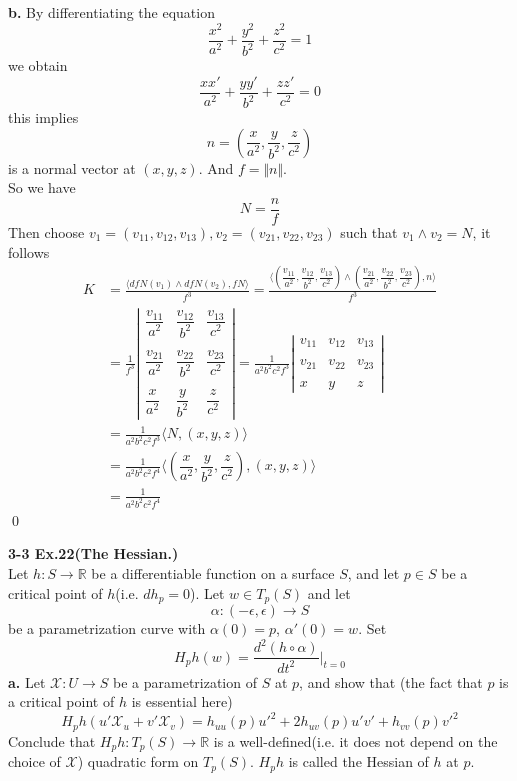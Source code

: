 \documentclass{article}
\begin{document}
\par
\textbf{b. }By differentiating the equation 
$$
    \frac{x^2}{a^2} + \frac{y^2}{b^2} + \frac{z^2}{c^2} = 1
$$
we obtain
$$
    \frac{xx'}{a^2} + \frac{yy'}{b^2} + \frac{zz'}{c^2} = 0
$$
this implies
$$
    n = (\frac{x}{a^2}, \frac{y}{b^2}, \frac{z}{c^2})
$$
is a normal vector at $(x,y,z)$. And $f = \Vert n \Vert$.\\
So we have
$$
    N = \frac{n}{f}
$$
Then choose $v_1 = (v_{11}, v_{12}, v_{13}), v_2 = (v_{21}, v_{22}, v_{23})$ 
such that $v_1 \wedge v_2 = N$, it follows
$$
\begin{aligned}
    K &= \frac{\langle dfN(v_1) \wedge dfN(v_2), fN \rangle}{f^3}
    = \frac{\langle (\dfrac{v_{11}}{a^2}, \dfrac{v_{12}}{b^2}, \dfrac{v_{13}}{c^2}) \wedge (\dfrac{v_{21}}{a^2}, \dfrac{v_{22}}{b^2}, \dfrac{v_{23}}{c^2}), n \rangle}{f^3}\\
    &= \frac{1}{f^3}
    \left|
    \begin{array}{ccc}
        \dfrac{v_{11}}{a^2} & \dfrac{v_{12}}{b^2} & \dfrac{v_{13}}{c^2}\\\\
        \dfrac{v_{21}}{a^2} & \dfrac{v_{22}}{b^2} & \dfrac{v_{23}}{c^2}\\\\
        \dfrac{x}{a^2}&\dfrac{y}{b^2}&\dfrac{z}{c^2}
    \end{array}
    \right|
    = \frac{1}{a^2b^2c^2f^3}
    \left|
    \begin{array}{ccc}
        v_{11} & v_{12} & v_{13}\\\\
        v_{21} & v_{22} & v_{23}\\\\
        x&y&z
    \end{array}
    \right|\\
    &= \frac{1}{a^2b^2c^2f^3}\langle N, (x,y,z)\rangle\\
    &= \frac{1}{a^2b^2c^2f^4}\langle (\dfrac{x}{a^2}, \dfrac{y}{b^2}, \dfrac{z}{c^2}), (x,y,z)\rangle\\
    &= \frac{1}{a^2b^2c^2f^4}
\end{aligned}
$$
\qed

\par
\textbf{3-3 Ex.22(The Hessian.)}\\
Let $h:S \to \mathbb{R}$ be a differentiable function on a surface $S$,
and let $p \in S$ be a critical point of $h$(i.e. $dh_p = 0$). Let $w \in T_p(S)$
and let
$$
    \alpha: (-\epsilon, \epsilon) \to S
$$
be a parametrization curve with $\alpha(0)=p$, $\alpha'(0)=w$. Set
$$
    H_ph(w) = \frac{d^2(h \circ \alpha)}{dt^2}|_{t=0}
$$
\textbf{a. }Let $\mathcal{X}: U \to S$ be a parametrization of $S$ at $p$, and show
that (the fact that $p$ is a critical point of $h$ is essential here)
$$
    H_ph(u'\mathcal{X}_u + v'\mathcal{X}_v) = h_{uu}(p)u'^2 + 2h_{uv}(p)u'v' + h_{vv}(p)v'^2
$$
Conclude that $H_ph: T_p(S) \to \mathbb{R}$ is a well-defined(i.e. it does not depend
on the choice of $\mathcal{X}$) quadratic form on $T_p(S)$. $H_ph$ is called the
Hessian of $h$ at $p$.
\end{document}
